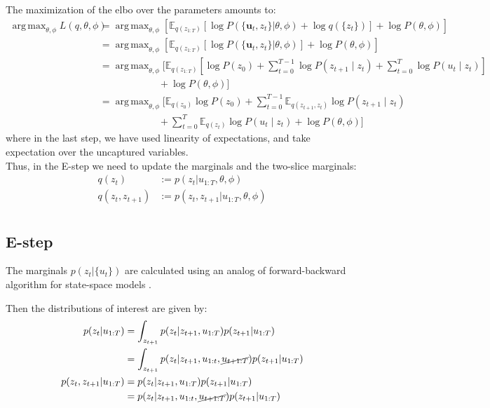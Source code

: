 \documentclass[11pt, reqno]{article}
\DeclareMathOperator*{\argmax}{arg\,max}
\numberwithin{equation}{section}
\begin{document}
\noindent  The maximization of the elbo over the parameters amounts to:  
\begin{align}
\argmax_{\theta, \phi} L(q,\theta,\phi) &= \argmax_{\theta, \phi} \left[ \mathbb{E}_{q(z_{1:T})} \left[ \log P(\{\bm{u}_t, z_t\}|\theta, \phi)  + \log q(\{z_t\}) \right]+ \log P(\theta, \phi) \right] \\
&= \argmax_{\theta, \phi} \left[\mathbb{E}_{q(z_{1:T})} \left[ \log P(\{\bm{u}_t, z_t\}|\theta, \phi)\right]+ \log P(\theta, \phi) \right] \\
&= \argmax_{\theta, \phi} \Bigg[\mathbb{E}_{q(z_{1:T})} \left[ \log P(z_0) + \sum_{t=0}^{T-1} \log P(z_{t+1} \mid z_t) + \sum_{t=0}^T \log P(u_t \mid z_t)   \right] \\
&\hspace{6em} + \log P(\theta, \phi) \Bigg] \\
&= \argmax_{\theta, \phi} \Bigg[\mathbb{E}_{q(z_0)} \log P(z_0) + \sum_{t=0}^{T-1} \mathbb{E}_{q(z_{t+1}, z_t)} \log P(z_{t+1} \mid z_t) \\
&\hspace{6em} + \sum_{t=0}^T \mathbb{E}_{q(z_t)} \log P(u_t \mid z_t)  + \log P(\theta, \phi) \Bigg] \label{M-objective}
\end{align}
where in the last step, we have used linearity of expectations, and take expectation over the uncaptured variables.\\

Thus, in the E-step we need to update the marginals and the two-slice marginals:
\begin{align*}
q(z_t) &:= p(z_t | u_{1:T}, \theta,\phi) \\
q(z_t, z_{t+1}) &:= p(z_t, z_{t+1} | u_{1:T}, \theta,\phi) \\
\end{align*}

\subsection{E-step}
The marginals $p(z_t | \{u_t\}) $ are calculated using an analog of forward-backward algorithm for state-space models \cite{Murphy2012, Shumway1982}.

Then the distributions of interest are given by:
\begin{align}
p(z_t | u_{1:T}) & = \int_{z_{t+1}} p(z_t | z_{t+1}, u_{1:T})  p(z_{t+1}| u_{1:T}) \\
& = \int_{z_{t+1}} p(z_t | z_{t+1}, u_{1:t}, \cancel{u_{t+1:T}})  p(z_{t+1}| u_{1:T}) \label{smooth1}\\
p(z_t, z_{t+1} | u_{1:T})  & = p(z_t|  z_{t+1}, u_{1:T})  p(z_{t+1}| u_{1:T}) \\
& = p(z_t|  z_{t+1}, u_{1:t},\cancel{u_{t+1:T}})  p(z_{t+1}| u_{1:T}) 
\end{align}
\end{document}
